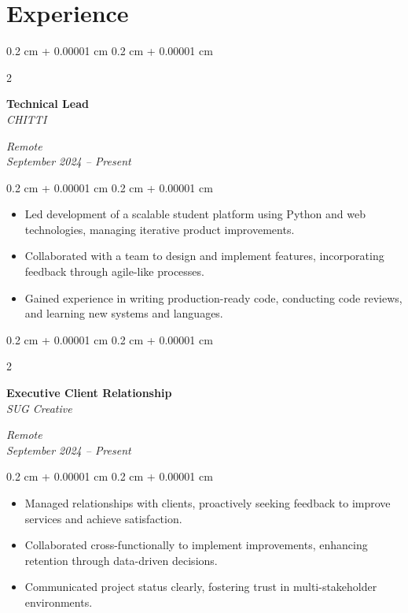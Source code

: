 \documentclass[10pt, letterpaper]{article}
\newenvironment{highlights}{
    \begin{itemize}[
        topsep=0.10 cm,
        parsep=0.10 cm,
        partopsep=0pt,
        itemsep=0pt,
        leftmargin=0.4 cm + 10pt
    ]
}{
    \end{itemize}
} %
\newenvironment{onecolentry}{
    \begin{adjustwidth}{
        0.2 cm + 0.00001 cm
    }{
        0.2 cm + 0.00001 cm
    }
}{
    \end{adjustwidth}
} %
\newenvironment{twocolentry}[2][]{
    \onecolentry
    \def\secondColumn{#2}
    \setcolumnwidth{\fill, 4.5 cm}
    \begin{paracol}{2}
}{
    \switchcolumn \raggedleft \secondColumn
    \end{paracol}
    \endonecolentry
} %
\begin{document}
    \section{Experience}
    \begin{twocolentry}{
        \textit{Remote} \\
        \textit{September 2024 – Present}
    }
        \textbf{Technical Lead} \\
        \textit{CHITTI}
    \end{twocolentry}
    \vspace{0.10 cm}
    \begin{onecolentry}
        \begin{highlights}
            \item Led development of a scalable student platform using Python and web technologies, managing iterative product improvements.
            \item Collaborated with a team to design and implement features, incorporating feedback through agile-like processes.
            \item Gained experience in writing production-ready code, conducting code reviews, and learning new systems and languages.
        \end{highlights}
    \end{onecolentry}
    \vspace{0.2 cm}
    \begin{twocolentry}{
        \textit{Remote} \\
        \textit{September 2024 – Present}
    }
        \textbf{Executive Client Relationship} \\
        \textit{SUG Creative}
    \end{twocolentry}
    \vspace{0.10 cm}
    \begin{onecolentry}
        \begin{highlights}
            \item Managed relationships with clients, proactively seeking feedback to improve services and achieve satisfaction.
            \item Collaborated cross-functionally to implement improvements, enhancing retention through data-driven decisions.
            \item Communicated project status clearly, fostering trust in multi-stakeholder environments.
        \end{highlights}
    \end{onecolentry}
    \vspace{0.2 cm}
\end{document}
